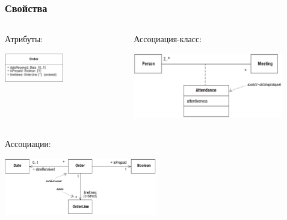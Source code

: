 \documentclass{../../slides-style}
\begin{document}
    \begin{frame}
        \frametitle{Свойства}
        \begin{columns}
            \begin{column}{0.5\textwidth}
                Атрибуты:
                \begin{center}
                    \includegraphics[width=0.5\textwidth]{attributes.png}
                \end{center}
            \end{column}
            \begin{column}{0.5\textwidth}
                Ассоциация-класс:
                \begin{center}
                    \includegraphics[width=0.85\textwidth]{classAssociation.png}
                \end{center}
            \end{column}
        \end{columns}
        \vspace{5mm}
        Ассоциации:
        \begin{center}
            \includegraphics[width=0.5\textwidth]{associations.png}
        \end{center}
    \end{frame}
\end{document}
